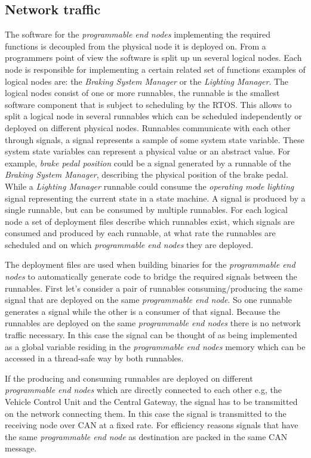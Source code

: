 \subsection{Network traffic}
The software for the \textit{programmable end nodes} implementing the required functions is decoupled from the physical node it is deployed on. From a programmers point of view the software is split up un several logical nodes. Each node is responsible for implementing a certain related set of functions examples of logical nodes are: the \textit{Braking System Manager} or the \textit{Lighting Manager}. The logical nodes consist of one or more runnables, the runnable is the smallest software component that is subject to scheduling by the RTOS. This allows to split a logical node in several runnables which can be scheduled independently or deployed on different physical nodes. Runnables communicate with each other through signals, a signal represents a sample of some system state variable. These system state variables can represent a physical value or an abstract value. For example, \textit{brake pedal position} could be a signal generated by a runnable of the \textit{Braking System Manager}, describing the physical position of the brake pedal. While a \textit{Lighting Manager} runnable could consume the \textit{operating mode lighting} signal representing the current state in a state machine. A signal is produced by a single runnable, but can be consumed by multiple runnables. For each logical node a set of deployment files describe which runnables exist, which signals are consumed and produced by each runnable, at what rate the runnables are scheduled and on which \textit{programmable end nodes} they are deployed.

The deployment files are used when building binaries for the \textit{programmable end nodes} to automatically generate code to bridge the required signals between the runnables. First let's consider a pair of runnables consuming/producing the same signal that are deployed on the same \textit{programmable end node}. So one runnable generates a signal while the other is a consumer of that signal. Because the runnables are deployed on the same \textit{programmable end nodes} there is no network traffic necessary. In this case the signal can be thought of as being implemented as a global variable residing in the \textit{programmable end nodes} memory which can be accessed in a thread-safe way by both runnables.

If the producing and consuming runnables are deployed on different \textit{programmable end nodes} which are directly connected to each other e.g, the Vehicle Control Unit and the Central Gateway, the signal has to be transmitted on the network connecting them. In this case the signal is transmitted to the receiving node over CAN at a fixed rate. For efficiency reasons signals that have the same \textit{programmable end node} as destination are packed in the same CAN message.

